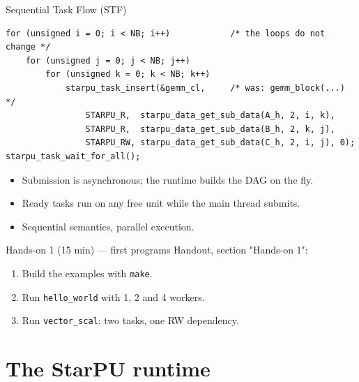 \documentclass[presentation, aspectratio=169]{beamer}
\begin{document}
\begin{frame}[label={sec:orgd393f2f},fragile]{Sequential Task Flow (STF)}
 \scriptsize
\begin{verbatim}
for (unsigned i = 0; i < NB; i++)            /* the loops do not change */
    for (unsigned j = 0; j < NB; j++)
        for (unsigned k = 0; k < NB; k++)
            starpu_task_insert(&gemm_cl,     /* was: gemm_block(...) */
                STARPU_R,  starpu_data_get_sub_data(A_h, 2, i, k),
                STARPU_R,  starpu_data_get_sub_data(B_h, 2, k, j),
                STARPU_RW, starpu_data_get_sub_data(C_h, 2, i, j), 0);
starpu_task_wait_for_all();
\end{verbatim}
\normalsize

\begin{itemize}
\item Submission is \alert{asynchronous}; the runtime builds the DAG on the fly.
\item Ready tasks run on any free unit while the main thread submits.
\item Sequential semantics, parallel execution.
\end{itemize}
\end{frame}
\begin{frame}[label={sec:org6676a6d},fragile]{Hands-on 1 (15 min) --- first programs}
 Handout, section "Hands-on 1":
\begin{enumerate}
\item Build the examples with \texttt{make}.
\item Run \texttt{hello\_world} with 1, 2 and 4 workers.
\item Run \texttt{vector\_scal}: two tasks, one RW dependency.
\end{enumerate}
\end{frame}
\section{The StarPU runtime}
\label{sec:org20adee1}
\end{document}
